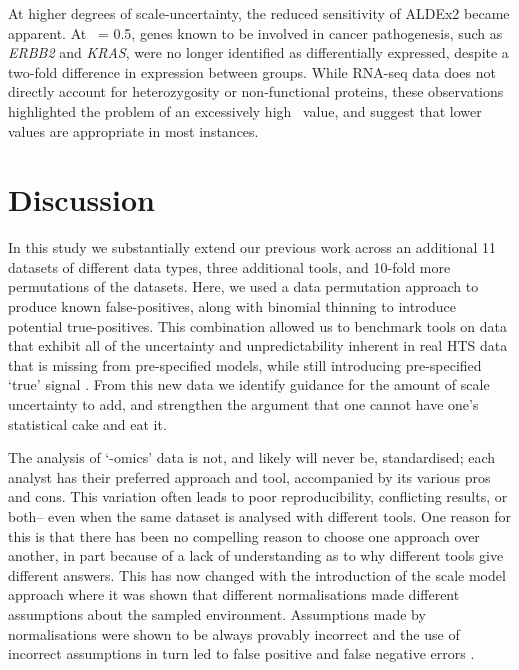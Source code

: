 \documentclass[10pt,letterpaper]{article}
\begin{document}
At higher degrees of scale-uncertainty, the reduced sensitivity of ALDEx2 became apparent. At \textgamma~= 0.5, genes known to be involved in cancer pathogenesis, such as \textit{ERBB2} and \textit{KRAS}, were no longer identified as differentially expressed, despite a two-fold difference in expression between groups. While RNA-seq data does not directly account for heterozygosity or non-functional proteins, these observations highlighted the problem of an excessively high \textgamma~value, and suggest that lower values are appropriate in most instances.


\section*{Discussion}

In this study we substantially extend our previous work across an additional 11 datasets of different data types, three additional tools, and 10-fold more permutations of the datasets. Here, we used a data permutation approach \cite{li_exaggerated_2022} to produce known false-positives, along with binomial thinning \cite{gerard_data-based_2020} to introduce potential true-positives. This combination allowed us to benchmark tools on data that exhibit all of the uncertainty and unpredictability inherent in real HTS data that is missing from pre-specified models, while still introducing pre-specified `true' signal \cite{gerard_data-based_2020}. From this new data we identify guidance for the amount of scale uncertainty to add, and strengthen the argument that one cannot have one's statistical cake and eat it. 

The analysis of `-omics' data is not, and likely will never be, standardised; each analyst has their preferred approach and tool, accompanied by its various pros and cons. This variation often leads to poor reproducibility, conflicting results, or both-- even when the same dataset is analysed with different tools. One reason for this is that there has been no compelling reason to choose one approach over another, in part because of a lack of understanding as to why different tools give different answers. This has now changed with the introduction of the scale model approach \cite{nixon_scale_2024} where it was shown that different normalisations made different assumptions about the sampled environment. Assumptions made by normalisations were shown to be always provably incorrect and the use of incorrect assumptions in turn led to false positive and false negative errors \cite{nixon_scale_2024, nixon_incorporating_2025, gloor_explicit_2025, mcgovern_replacing_2025}.
\end{document}
